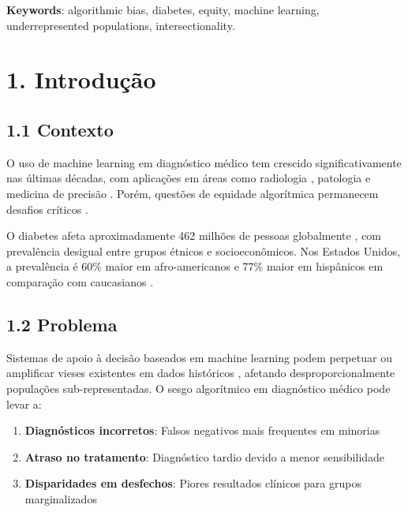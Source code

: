 \documentclass[12pt,a4paper]{article}
\begin{document}
\textbf{Keywords}: algorithmic bias, diabetes, equity, machine learning, 
underrepresented populations, intersectionality.

\section{1. Introdução}

\subsection{1.1 Contexto}

O uso de machine learning em diagnóstico médico tem crescido significativamente 
nas últimas décadas, com aplicações em áreas como radiologia \cite{rajpurkar2017}, 
patologia \cite{esteva2017} e medicina de precisão \cite{topol2019}. Porém, 
questões de equidade algorítmica permanecem desafios críticos \cite{mehrabi2021}.

O diabetes afeta aproximadamente 462 milhões de pessoas globalmente 
\cite{idf2021}, com prevalência desigual entre grupos étnicos e 
socioeconômicos. Nos Estados Unidos, a prevalência é 60\% maior em 
afro-americanos e 77\% maior em hispânicos em comparação com caucasianos 
\cite{cdc2020}.

\subsection{1.2 Problema}

Sistemas de apoio à decisão baseados em machine learning podem perpetuar ou 
amplificar vieses existentes em dados históricos \cite{barocas2019}, afetando 
desproporcionalmente populações sub-representadas. O sesgo algorítmico em 
diagnóstico médico pode levar a:

\begin{enumerate}
    \item \textbf{Diagnósticos incorretos}: Falsos negativos mais frequentes 
          em minorias
    \item \textbf{Atraso no tratamento}: Diagnóstico tardio devido a menor 
          sensibilidade
    \item \textbf{Disparidades em desfechos}: Piores resultados clínicos 
          para grupos marginalizados
\end{enumerate}
\end{document}
